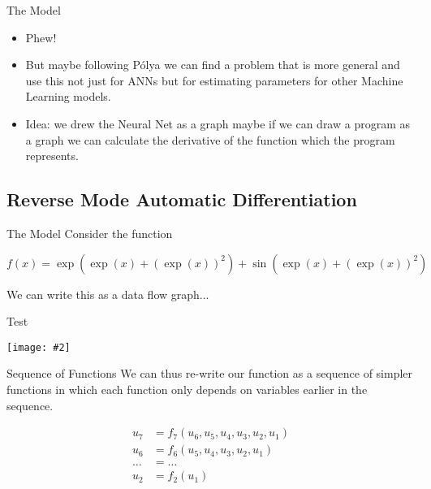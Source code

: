 \documentclass{beamer}
\newcommand {\framedgraphic}[2] {
    \begin{frame}{#1}
        \begin{center}
            \texttt{[image: \#2]}
        \end{center}
    \end{frame}
}
\begin{document}
\begin{frame}[fragile]{The Model}
\begin{itemize}
\item
Phew!
\item
But maybe following P\'{o}lya we can find a problem that is more
general and use this not just for ANNs but for estimating parameters
for other Machine Learning models.
\item
Idea: we drew the Neural Net as a graph maybe if we can draw a program as a
graph we can calculate the derivative of the function which the
program represents.
\end{itemize}
\end{frame}

\subsection{Reverse Mode Automatic Differentiation}

\begin{frame}[fragile]{The Model}
Consider the function

$$
f(x) = \exp(\exp(x) + (\exp(x))^2) + \sin(\exp(x) + (\exp(x))^2)
$$

We can write this as a data flow graph...
\end{frame}

\framedgraphic{Test}{diagrams/02c0671aa558b88e5ed6f195b22bbd8a.png}

\begin{frame}[fragile]{Sequence of Functions}
We can thus re-write our function as a sequence of simpler functions
in which each function only depends on variables earlier in the
sequence.

$$
\begin{aligned}
u_7    &= f_7(u_6, u_5, u_4, u_3, u_2, u_1) \\
u_6    &= f_6(u_5, u_4, u_3, u_2, u_1) \\
\ldots &= \ldots \\
u_2    &= f_2(u_1)
\end{aligned}
$$
\end{frame}
\end{document}
